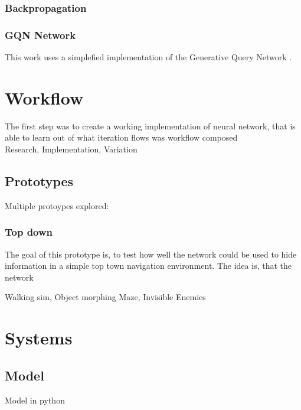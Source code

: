 \documentclass[a4paper, twoside, 10pt]{report}
\begin{document}
\subsection{Backpropagation}
\subsection{GQN Network}
This work uses a simplefied implementation of the Generative Query Network \cite{gqn}.



\chapter{Workflow}
The first step was to create a working implementation of neural network, that is able to learn
out of what iteration flows was workflow composed \\
Research, Implementation, Variation

\section{Prototypes}
Multiple protoypes explored:

\subsection{Top down}
The goal of this prototype is, to test how well the network could be used to hide information in a simple top town navigation environment.
The idea is, that the network

Walking sim,
Object morphing
Maze,
Invisible Enemies



\chapter{Systems}
\section{Model}
Model in python
\end{document}
